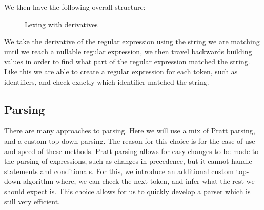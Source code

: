 We then have the following overall structure:
\begin{center}
\begin{figure}[hbt!]
\caption{Lexing with derivatives}
\label{fig:lexing}
\end{figure}
\end{center}

We take the derivative of the regular expression using the string we are matching until we reach a nullable regular expression, we then travel backwards building values in order to find what part of the regular expression matched the string.
Like this we are able to create a regular expression for each token, such as identifiers, and check exactly which identifier matched the string.

\subsection*{Parsing}
There are many approaches to parsing.
Here we will use a mix of Pratt parsing, and a custom top down parsing.
The reason for this choice is for the ease of use and speed of these methods.
Pratt parsing allows for easy changes to be made to the parsing of expressions, such as changes in precedence, but it cannot handle statements and conditionals.
For this, we introduce an additional custom top-down algorithm where, we can check the next token, and infer what the rest we should expect is.
This choice allows for us to quickly develop a parser which is still very efficient.

